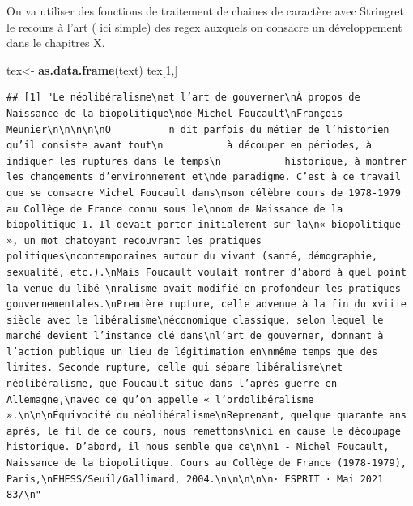 \documentclass[
]{book}
\newenvironment{Shaded}{\begin{snugshade}}{\end{snugshade}}
\newcommand{\DecValTok}[1]{\textcolor[rgb]{0.00,0.00,0.81}{#1}}
\newcommand{\KeywordTok}[1]{\textcolor[rgb]{0.13,0.29,0.53}{\textbf{#1}}}
\newcommand{\NormalTok}[1]{#1}
\newcommand{\StringTok}[1]{\textcolor[rgb]{0.31,0.60,0.02}{#1}}
\begin{document}
On va utiliser des fonctions de traitement de chaines de caractère avec Stringret le recours à l'art ( ici simple) des regex auxquels on consacre un développement dans le chapitres X.

\begin{Shaded}
\begin{Highlighting}[]
\NormalTok{tex<-}\StringTok{ }\KeywordTok{as.data.frame}\NormalTok{(text)}
\NormalTok{tex[}\DecValTok{1}\NormalTok{,]}
\end{Highlighting}
\end{Shaded}

\begin{verbatim}
## [1] "Le néolibéralisme\net l’art de gouverner\nÀ propos de Naissance de la biopolitique\nde Michel Foucault\nFrançois Meunier\n\n\n\n\nO          n dit parfois du métier de l’historien qu’il consiste avant tout\n           à découper en périodes, à indiquer les ruptures dans le temps\n           historique, à montrer les changements d’environnement et\nde paradigme. C’est à ce travail que se consacre Michel Foucault dans\nson célèbre cours de 1978-1979 au Collège de France connu sous le\nnom de Naissance de la biopolitique 1. Il devait porter initialement sur la\n« biopolitique », un mot chatoyant recouvrant les pratiques politiques\ncontemporaines autour du vivant (santé, démographie, sexualité, etc.).\nMais Foucault voulait montrer d’abord à quel point la venue du libé-\nralisme avait modifié en profondeur les pratiques gouvernementales.\nPremière rupture, celle advenue à la fin du xviiie siècle avec le libéralisme\néconomique classique, selon lequel le marché devient l’instance clé dans\nl’art de gouverner, donnant à l’action publique un lieu de légitimation en\nmême temps que des limites. Seconde rupture, celle qui sépare libéralisme\net néolibéralisme, que Foucault situe dans l’après-guerre en Allemagne,\navec ce qu’on appelle « l’ordolibéralisme ».\n\n\nÉquivocité du néolibéralisme\nReprenant, quelque quarante ans après, le fil de ce cours, nous remettons\nici en cause le découpage historique. D’abord, il nous semble que ce\n\n1 - Michel Foucault, Naissance de la biopolitique. Cours au Collège de France (1978-1979), Paris,\nEHESS/Seuil/Gallimard, 2004.\n\n\n\n\n· ESPRIT · Mai 2021                                                                                 83/\n"
\end{verbatim}
\end{document}
